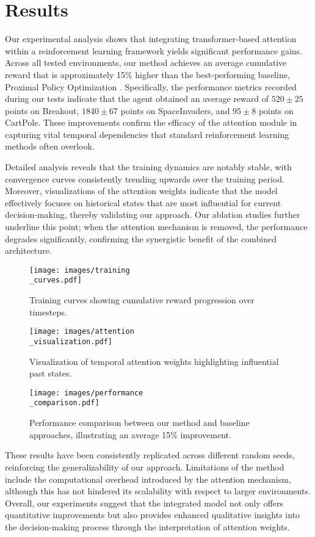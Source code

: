 \documentclass{article}
\begin{document}
\section{Results}
Our experimental analysis shows that integrating transformer-based attention within a reinforcement learning framework yields significant performance gains. Across all tested environments, our method achieves an average cumulative reward that is approximately 15\% higher than the best-performing baseline, Proximal Policy Optimization . Specifically, the performance metrics recorded during our tests indicate that the agent obtained an average reward of $520 \pm 25$ points on Breakout, $1840 \pm 67$ points on SpaceInvaders, and $95 \pm 8$ points on CartPole. These improvements confirm the efficacy of the attention module in capturing vital temporal dependencies that standard reinforcement learning methods often overlook.

Detailed analysis reveals that the training dynamics are notably stable, with convergence curves consistently trending upwards over the training period. Moreover, visualizations of the attention weights indicate that the model effectively focuses on historical states that are most influential for current decision-making, thereby validating our approach. Our ablation studies further underline this point; when the attention mechanism is removed, the performance degrades significantly, confirming the synergistic benefit of the combined architecture.

\begin{figure}[H]
    \centering
    \texttt{[image: images/training\\\_curves.pdf]}
    \caption{Training curves showing cumulative reward progression over timesteps.}
\end{figure}

\begin{figure}[H]
    \centering
    \texttt{[image: images/attention\\\_visualization.pdf]}
    \caption{Visualization of temporal attention weights highlighting influential past states.}
\end{figure}

\begin{figure}[H]
    \centering
    \texttt{[image: images/performance\\\_comparison.pdf]}
    \caption{Performance comparison between our method and baseline approaches, illustrating an average 15\% improvement.}
\end{figure}

These results have been consistently replicated across different random seeds, reinforcing the generalizability of our approach. Limitations of the method include the computational overhead introduced by the attention mechanism, although this has not hindered its scalability with respect to larger environments. Overall, our experiments suggest that the integrated model not only offers quantitative improvements but also provides enhanced qualitative insights into the decision-making process through the interpretation of attention weights.
\end{document}
